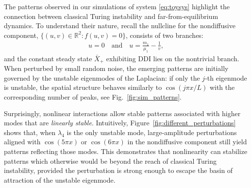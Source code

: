 \documentclass[12pt, a4paper]{amsart}
\numberwithin{equation}{section}
\newcommand{\RR}{\mathbb{R}}
\begin{document}
The patterns observed in our simulations of system \eqref{eq:toysys} highlight the connection between classical Turing instability and far-from-equilibrium dynamics. To understand their nature, recall the nullcline for the nondiffusive component, $\{(u, v) \in \RR^2 : f (u, v) = 0 \}$, consists of two branches:
\begin{align*}
    u = 0 \quad \text{and}\quad u = \frac{m_1}{\mu_1} - \frac{1}{v},
\end{align*}
and the constant steady state $\bar X_+$ exhibiting DDI lies on the nontrivial branch. 
When perturbed by small random noise, the emerging patterns are initially governed by the unstable eigenmodes of the Laplacian: if only the $j$-th eigenmode is unstable, the spatial structure behaves similarly to $\cos(j\pi x/L)$ with the corresponding number of peaks, see Fig.~\ref{fig:sim_patterns}.

Surprisingly, nonlinear interactions allow stable patterns associated with higher modes that are \emph{linearly stable}. Intuitively, 
Figure~\ref{fig:different_perturbations} shows that, when $\lambda_4$ is the only unstable mode, large-amplitude perturbations aligned with $\cos(5\pi x)$ or $\cos(6\pi x)$ in the nondiffusive component still yield patterns reflecting those modes. 
This demonstrates that nonlinearity can stabilize patterns which otherwise would be beyond the reach of classical Turing instability,
provided the perturbation is strong enough to escape the basin of attraction of the unstable eigenmode.
\end{document}
